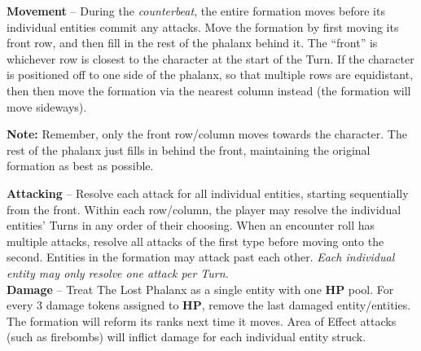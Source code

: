 \textbf{Movement} -- During the \emph{counterbeat}, the entire formation moves before its individual entities commit any attacks. Move the formation by first moving its front row, and then fill in the rest of the phalanx behind it. The “front” is whichever row is closest to the character at the start of the Turn. If the character is positioned off to one side of the phalanx, so that multiple rows are equidistant, then then move the formation via the nearest column instead (the formation will move sideways).

\begin{tcolorbox}
\textbf{Note:} Remember, only the front row/column moves towards the character. The rest of the phalanx just fills in behind the front, maintaining the original formation as best as possible.
\end{tcolorbox}

\textbf{Attacking} -- Resolve each attack for all individual entities, starting sequentially from the front. Within each row/column, the player may resolve the individual entities’ Turns in any order of their choosing. When an encounter roll has multiple attacks, resolve all attacks of the first type before moving onto the second. Entities in the formation may attack past each other. \emph{Each individual entity may only resolve one attack per Turn.}\\

\textbf{Damage} --  Treat The Lost Phalanx as a single entity with one \textbf{HP} pool. For every 3 damage tokens assigned to \textbf{HP}, remove the last damaged entity/entities. The formation will reform its ranks next time it moves. Area of Effect attacks (such as firebombs) will inflict damage for each individual entity struck.

